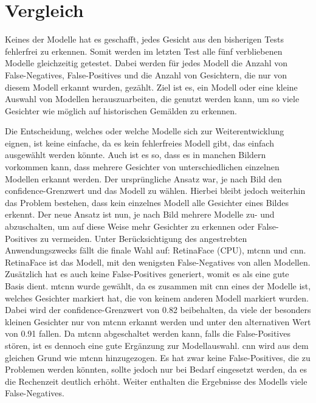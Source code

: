 %

\section{Vergleich}
Keines der Modelle hat es geschafft, jedes Gesicht aus den bisherigen Tests fehlerfrei zu erkennen. Somit werden im letzten Test alle fünf verbliebenen Modelle gleichzeitig getestet. Dabei werden für jedes Modell die Anzahl von False-Negatives, False-Positives und die Anzahl von Gesichtern, die nur von diesem Modell erkannt wurden, gezählt. Ziel ist es, ein Modell oder eine kleine Auswahl von Modellen herauszuarbeiten, die genutzt werden kann, um so viele Gesichter wie möglich auf historischen Gemälden zu erkennen.

Die Entscheidung, welches oder welche Modelle sich zur Weiterentwicklung eignen, ist keine einfache, da es kein fehlerfreies Modell gibt, das einfach ausgewählt werden könnte. Auch ist es so, dass es in manchen Bildern vorkommen kann, dass mehrere Gesichter von unterschiedlichen einzelnen Modellen erkannt werden. Der ursprüngliche Ansatz war, je nach Bild den \gls{confidence}-Grenzwert und das Modell zu wählen. Hierbei bleibt jedoch weiterhin das Problem bestehen, dass kein einzelnes Modell alle Gesichter eines Bildes erkennt. Der neue Ansatz ist nun, je nach Bild mehrere Modelle zu- und abzuschalten, um auf diese Weise mehr Gesichter zu erkennen oder False-Positives zu vermeiden. Unter Berücksichtigung des angestrebten Anwendungszwecks fällt die finale Wahl auf: RetinaFace (CPU), \gls{mtcnn} und \gls{cnn}. RetinaFace ist das Modell, mit den wenigsten False-Negatives von allen Modellen. Zusätzlich hat es auch keine False-Positives generiert, womit es als eine gute Basis dient. \gls{mtcnn} wurde gewählt, da es zusammen mit \gls{cnn} eines der Modelle ist, welches Gesichter markiert hat, die von keinem anderen Modell markiert wurden. Dabei wird der \gls{confidence}-Grenzwert von 0.82 beibehalten, da viele der besonders kleinen Gesichter nur von \gls{mtcnn} erkannt werden und unter den alternativen Wert von 0.91 fallen. Da \gls{mtcnn} abgeschaltet werden kann, falls die False-Positives stören, ist es dennoch eine gute Ergänzung zur Modellauswahl. \gls{cnn} wird aus dem gleichen Grund wie \gls{mtcnn} hinzugezogen. Es hat zwar keine False-Positives, die zu Problemen werden könnten, sollte jedoch nur bei Bedarf eingesetzt werden, da es die Rechenzeit deutlich erhöht. Weiter enthalten die Ergebnisse des Modells viele False-Negatives.